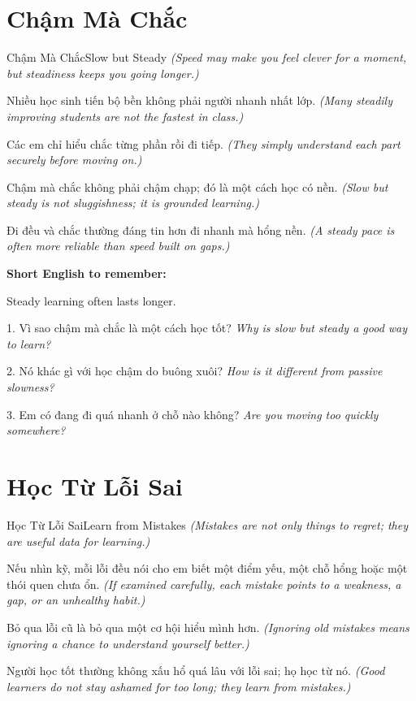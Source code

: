 \section{Chậm Mà Chắc}
\begin{truyen}{Chậm Mà Chắc}{Slow but Steady}
\textit{(Speed may make you feel clever for a moment, but steadiness keeps you going longer.)}

Nhiều học sinh tiến bộ bền không phải người nhanh nhất lớp.
\textit{(Many steadily improving students are not the fastest in class.)}

Các em chỉ hiểu chắc từng phần rồi đi tiếp.
\textit{(They simply understand each part securely before moving on.)}

Chậm mà chắc không phải chậm chạp; đó là một cách học có nền.
\textit{(Slow but steady is not sluggishness; it is grounded learning.)}
\end{truyen}

\begin{baihoc}
Đi đều và chắc thường đáng tin hơn đi nhanh mà hổng nền.
\textit{(A steady pace is often more reliable than speed built on gaps.)}
\end{baihoc}

\begin{ghinhoanh}
\textbf{Short English to remember:}

Steady learning often lasts longer.

\end{ghinhoanh}

\begin{tuhocnhanh}
1. Vì sao chậm mà chắc là một cách học tốt? \textit{Why is slow but steady a good way to learn?}

2. Nó khác gì với học chậm do buông xuôi? \textit{How is it different from passive slowness?}

3. Em có đang đi quá nhanh ở chỗ nào không? \textit{Are you moving too quickly somewhere?}
\end{tuhocnhanh}
\ngancach

\section{Học Từ Lỗi Sai}
\begin{truyen}{Học Từ Lỗi Sai}{Learn from Mistakes}
\textit{(Mistakes are not only things to regret; they are useful data for learning.)}

Nếu nhìn kỹ, mỗi lỗi đều nói cho em biết một điểm yếu, một chỗ hổng hoặc một thói quen chưa ổn.
\textit{(If examined carefully, each mistake points to a weakness, a gap, or an unhealthy habit.)}

Bỏ qua lỗi cũ là bỏ qua một cơ hội hiểu mình hơn.
\textit{(Ignoring old mistakes means ignoring a chance to understand yourself better.)}

Người học tốt thường không xấu hổ quá lâu với lỗi sai; họ học từ nó.
\textit{(Good learners do not stay ashamed for too long; they learn from mistakes.)}
\end{truyen}

